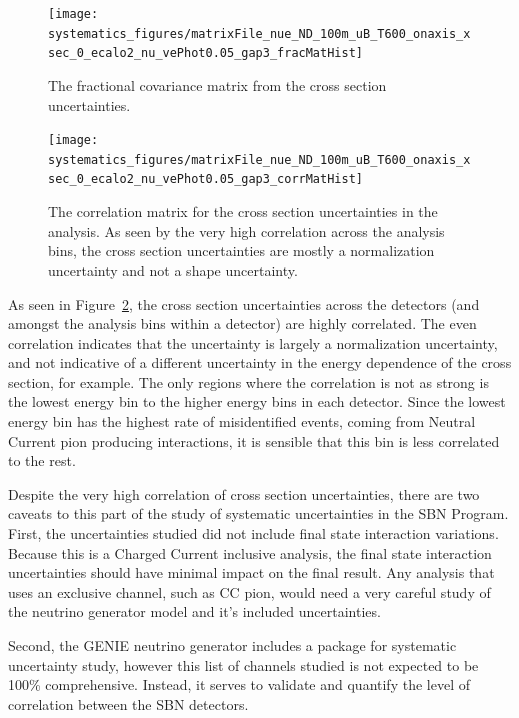 \begin{figure}[h]
    \centering
    \texttt{[image: systematics\_figures/matrixFile\_nue\_ND\_100m\_uB\_T600\_onaxis\_xsec\_0\_ecalo2\_nu\_vePhot0.05\_gap3\_fracMatHist]}
    \caption[\nue Cross Section Fractional Covariance Matrix]{The fractional covariance matrix from the cross section uncertainties.}
   \label{fig:syst_xsec_fracmatrix}
\end{figure}

\begin{figure}[h]
    \centering
    \texttt{[image: systematics\_figures/matrixFile\_nue\_ND\_100m\_uB\_T600\_onaxis\_xsec\_0\_ecalo2\_nu\_vePhot0.05\_gap3\_corrMatHist]}
    \caption[\nue Cross Section Correlation Matrix]{The correlation matrix for the cross section uncertainties in the \nue analysis.  As seen by the very high correlation across the analysis bins, the cross section uncertainties are mostly a normalization uncertainty and not a shape uncertainty.}
   \label{fig:syst_xsec_corrmatrix}
\end{figure}


As seen in Figure~\ref{fig:syst_xsec_corrmatrix}, the cross section uncertainties across the detectors (and amongst the analysis bins within a detector) are highly correlated.  The even correlation indicates that the uncertainty is largely a normalization uncertainty, and not indicative of a different uncertainty in the energy dependence of the cross section, for example.  The only regions where the correlation is not as strong is the lowest energy bin to the higher energy bins in each detector.  Since the lowest energy bin has the highest rate of misidentified events, coming from Neutral Current pion producing interactions, it is sensible that this bin is less correlated to the rest.

Despite the very high correlation of cross section uncertainties, there are two caveats to this part of the study of systematic uncertainties in the SBN Program.  First, the uncertainties studied did not include final state interaction variations.  Because this is a Charged Current inclusive analysis, the final state interaction uncertainties should have minimal impact on the final result.  Any analysis that uses an exclusive channel, such as CC  pion, would need a very careful study of the neutrino generator model and it's included uncertainties.

Second, the GENIE neutrino generator includes a package for systematic uncertainty study, however this list of channels studied is not expected to be 100\% comprehensive.  Instead, it serves to validate and quantify the level of correlation between the SBN detectors.

